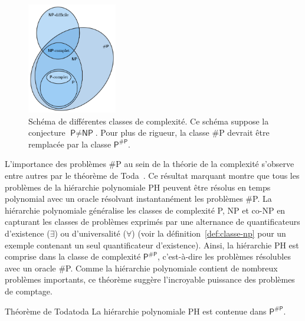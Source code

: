 \begin{figure}[h]
    \centering
    \includegraphics[width=0.35\textwidth]{figures/complexity-classes.png}
    \caption[Classes de complexité]{Schéma de différentes classes de complexité. Ce schéma suppose la conjecture $\textsf{P} \neq \textsf{NP}$. Pour plus de rigueur, la classe \textsf{\#P} devrait être remplacée par la classe $\textsf{P}^{\textsf{\#P}}$.}
    \label{fig:complexity-classes}
\end{figure}

L'importance des problèmes \textsf{\#P} au sein de la théorie de la complexité s'observe entre autres par le théorème de Toda~\cite{todaPPHardPolynomialTime1991}. Ce résultat marquant montre que tous les problèmes de la hiérarchie polynomiale \textsf{PH} peuvent être résolus en temps polynomial avec un oracle résolvant instantanément les problèmes \textsf{\#P}. La hiérarchie polynomiale généralise les classes de complexité \textsf{P}, \textsf{NP} et \textsf{co-NP} en capturant les classes de problèmes exprimés par une alternance de quantificateurs d'existence ($\exists$) ou d'universalité ($\forall$) (voir la définition~\ref{def:classe-np} pour un exemple contenant un seul quantificateur d'existence). Ainsi, la hiérarchie \textsf{PH} est comprise dans la classe de complexité $\textsf{P}^{\textsf{\#P}}$, c'est-à-dire les problèmes résolubles avec un oracle \textsf{\#P}. Comme la hiérarchie polynomiale contient de nombreux problèmes importants, ce théorème suggère l'incroyable puissance des problèmes de comptage.

\begin{subtheorem}{Théorème de Toda}{toda}
    La hiérarchie polynomiale \textsf{PH} est contenue dans $\textsf{P}^{\textsf{\#P}}$.
\end{subtheorem}

